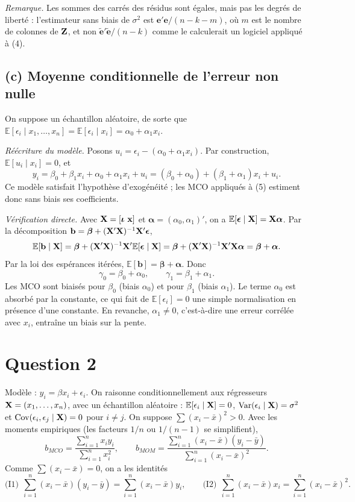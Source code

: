 \documentclass[11pt,a4paper]{article}
\newcommand{\vx}{\mathbf{x}}\newcommand{\ve}{\mathbf{e}}\newcommand{\vb}{\mathbf{b}}
\newcommand{\vbeta}{\bm{\beta}}\newcommand{\veps}{\bm{\epsilon}}\newcommand{\valpha}{\bm{\alpha}}
\newcommand{\viota}{\bm{\iota}}
\newcommand{\E}{\mathbb{E}}\newcommand{\Var}{\operatorname{Var}}\newcommand{\Cov}{\operatorname{Cov}}
\newcommand{\sumi}{\sum_{i=1}^{n}}
\begin{document}
\textit{Remarque.} Les sommes des carrés des résidus sont égales, mais pas les degrés de liberté : l'estimateur sans biais de $\sigma^2$ est $\ve'\ve/(n-k-m)$, où $m$ est le nombre de colonnes de $\mathbf{Z}$, et non $\tilde{\ve}'\tilde{\ve}/(n-k)$ comme le calculerait un logiciel appliqué à (4).

\subsection*{(c) Moyenne conditionnelle de l'erreur non nulle}

On suppose un échantillon aléatoire, de sorte que $\E[\epsilon_i\mid x_1,\dots,x_n]=\E[\epsilon_i\mid x_i]=\alpha_0+\alpha_1x_i$.

\textit{Réécriture du modèle.} Posons $u_i=\epsilon_i-(\alpha_0+\alpha_1x_i)$. Par construction, $\E[u_i\mid x_i]=0$, et
\[
y_i=\beta_0+\beta_1x_i+\alpha_0+\alpha_1x_i+u_i=(\beta_0+\alpha_0)+(\beta_1+\alpha_1)x_i+u_i .
\]
Ce modèle satisfait l'hypothèse d'exogénéité ; les MCO appliqués à (5) estiment donc sans biais ses coefficients.

\textit{Vérification directe.} Avec $\vX=[\viota\ \vx]$ et $\valpha=(\alpha_0,\alpha_1)'$, on a $\E[\veps\mid\vX]=\vX\valpha$. Par la décomposition $\vb=\vbeta+(\vX'\vX)^{-1}\vX'\veps$,
\[
\E[\vb\mid\vX]=\vbeta+(\vX'\vX)^{-1}\vX'\E[\veps\mid\vX]=\vbeta+(\vX'\vX)^{-1}\vX'\vX\valpha=\vbeta+\valpha .
\]
Par la loi des espérances itérées, $\E[\vb]=\vbeta+\valpha$. Donc
\[
\boxed{\gamma_0=\beta_0+\alpha_0,\qquad \gamma_1=\beta_1+\alpha_1.}
\]
Les MCO sont biaisés pour $\beta_0$ (biais $\alpha_0$) et pour $\beta_1$ (biais $\alpha_1$). Le terme $\alpha_0$ est absorbé par la constante, ce qui fait de $\E[\epsilon_i]=0$ une simple normalisation en présence d'une constante. En revanche, $\alpha_1\neq0$, c'est-à-dire une erreur corrélée avec $x_i$, entraîne un biais sur la pente.

\section*{Question 2}

Modèle : $y_i=\beta x_i+\epsilon_i$. On raisonne conditionnellement aux régresseurs $\mathbf{X}=(x_1,\dots,x_n)$, avec un échantillon aléatoire : $\E[\epsilon_i\mid\vX]=0$, $\Var(\epsilon_i\mid\vX)=\sigma^2$ et $\Cov(\epsilon_i,\epsilon_j\mid\vX)=0$ pour $i\ne j$. On suppose $\sum(x_i-\bar x)^2>0$. Avec les moments empiriques (les facteurs $1/n$ ou $1/(n-1)$ se simplifient),
\[
b_{MCO}=\frac{\sumi x_iy_i}{\sumi x_i^2},\qquad
b_{MOM}=\frac{\sumi(x_i-\bar x)(y_i-\bar y)}{\sumi(x_i-\bar x)^2}.
\]
Comme $\sum(x_i-\bar x)=0$, on a les identités
\[
\text{(I1)}\ \ \sumi(x_i-\bar x)(y_i-\bar y)=\sumi(x_i-\bar x)y_i,\qquad
\text{(I2)}\ \ \sumi(x_i-\bar x)x_i=\sumi(x_i-\bar x)^2 .
\]
\end{document}
